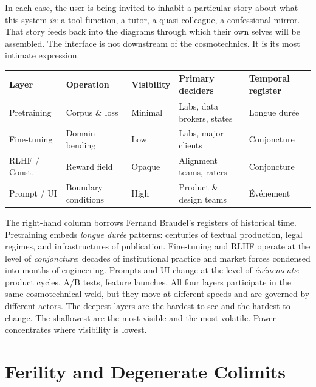 \documentclass[12pt,a4paper]{article}
\begin{document}
In each case, the user is being invited to inhabit a particular story about what this system \emph{is}: a tool function, a tutor, a quasi-colleague, a confessional mirror. That story feeds back into the diagrams through which their own selves will be assembled. The interface is not downstream of the cosmotechnics. It is its most intimate expression.

\begin{formalbox}[title={Four Depths of Control}]
\begin{center}
\begin{tabular}{@{}lllll@{}}
\toprule
\textbf{Layer} & \textbf{Operation} & \textbf{Visibility} & \textbf{Primary deciders} & \textbf{Temporal register} \\
\midrule
Pretraining  & Corpus \& loss         & Minimal   & Labs, data brokers, states & Longue dur\'ee \\
Fine-tuning  & Domain bending         & Low       & Labs, major clients        & Conjoncture \\
RLHF / Const.& Reward field           & Opaque    & Alignment teams, raters    & Conjoncture \\
Prompt / UI  & Boundary conditions    & High      & Product \& design teams    & \'Ev\'enement \\
\bottomrule
\end{tabular}
\end{center}
\end{formalbox}

The right-hand column borrows Fernand Braudel's registers of historical time. Pretraining embeds \emph{longue dur\'ee} patterns: centuries of textual production, legal regimes, and infrastructures of publication. Fine-tuning and RLHF operate at the level of \emph{conjoncture}: decades of institutional practice and market forces condensed into months of engineering. Prompts and UI change at the level of \emph{\'ev\'enements}: product cycles, A/B tests, feature launches. All four layers participate in the same cosmotechnical weld, but they move at different speeds and are governed by different actors. The deepest layers are the hardest to see and the hardest to change. The shallowest are the most visible and the most volatile. Power concentrates where visibility is lowest.

\section{Ferility and Degenerate Colimits}
\end{document}
